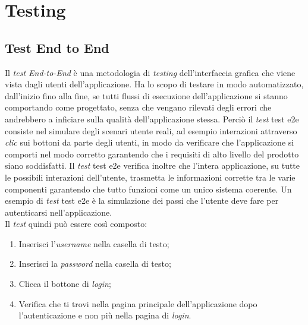 
\chapter{Testing}
\label{cap:test}
\section{Test End to End}
Il \emph{test End-to-End} è una metodologia di \emph{testing} dell'interfaccia grafica che viene vista dagli utenti dell'applicazione. Ha lo scopo di testare in modo automatizzato, dall'inizio fino alla fine, se tutti flussi di esecuzione dell'applicazione si stanno comportando come progettato, senza che vengano rilevati degli errori che andrebbero a inficiare sulla qualità dell’applicazione stessa. Perciò il \emph{test} \gls{test e2e} consiste nel simulare degli scenari utente reali, ad esempio interazioni attraverso \emph{clic} sui bottoni da parte degli utenti, in modo da verificare che l'applicazione si comporti nel modo corretto garantendo che i requisiti di alto livello del prodotto siano soddisfatti. Il \emph{test} \gls{test e2e} verifica inoltre che l'intera applicazione, su tutte le possibili interazioni dell'utente, trasmetta le informazioni corrette tra le varie componenti garantendo che tutto funzioni come un unico sistema coerente. Un esempio di \emph{test} \gls{test e2e} è la simulazione dei passi che l'utente deve fare per autenticarsi nell'applicazione.\\
Il \emph{test} quindi può essere così composto:
\begin{enumerate}
	\item Inserisci l'\emph{username} nella casella di testo;
	\item Inserisci la \emph{password} nella casella di testo;
	\item Clicca il bottone di \emph{login};
	\item Verifica che ti trovi nella pagina principale dell'applicazione dopo l'autenticazione e non più nella pagina di \emph{login}.
\end{enumerate}

